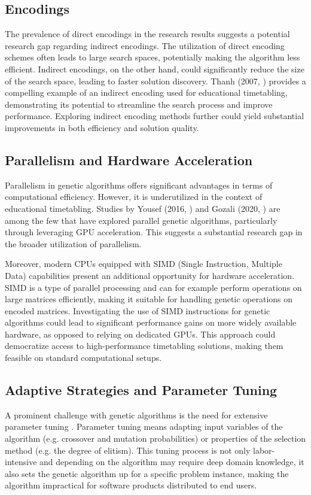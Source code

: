 \documentclass[sigconf]{acmart}
\begin{document}
\subsection{Encodings}
The prevalence of direct encodings in the research results suggests a potential
research gap regarding indirect encodings.
The utilization of direct encoding schemes often leads to large search spaces,
potentially making the algorithm less efficient.
%
Indirect encodings, on the other hand, could significantly reduce the size of
the search space, leading to faster solution discovery.
Thanh (2007, \cite{Thanh2007}) provides a compelling example of an indirect
encoding used for educational timetabling, demonstrating its potential to
streamline the search process and improve performance. Exploring indirect
encoding methods further could yield substantial improvements in both
efficiency and solution quality.

\subsection{Parallelism and Hardware Acceleration}
Parallelism in genetic algorithms offers significant advantages in terms of
computational efficiency. However, it is underutilized
in the context of educational timetabling. Studies by Yousef
(2016, \cite{yousef2016gpu}) and Gozali (2020, \cite{gozali2020islandmodel})
are among the few that have explored parallel genetic algorithms, particularly
through leveraging GPU acceleration. This suggests a substantial research gap
in the broader utilization of parallelism.

Moreover, modern CPUs equipped with SIMD (Single Instruction, Multiple Data)
capabilities present an additional opportunity for hardware acceleration.
SIMD is a type of parallel processing and can for example perform operations on
large matrices efficiently, making it suitable for handling genetic operations
on encoded matrices.
Investigating the use of SIMD instructions for genetic algorithms could lead
to significant performance gains on more widely available hardware, as opposed
to relying on dedicated GPUs.
This approach could democratize access to high-performance timetabling
solutions, making them feasible on standard computational setups.

\subsection{Adaptive Strategies and Parameter Tuning}
A prominent challenge with genetic algorithms is the need for extensive
parameter tuning \cite{Katoch2021}.
Parameter tuning means adapting input variables of the algorithm
(e.g. crossover and mutation probabilities) or properties of the selection
method (e.g. the degree of elitism).
%
This tuning process is not only labor-intensive and depending on the algorithm
may require deep domain knowledge, it also sets the genetic algorithm up for a
specific problem instance, making the algorithm impractical for software
products distributed to end users.
\end{document}
